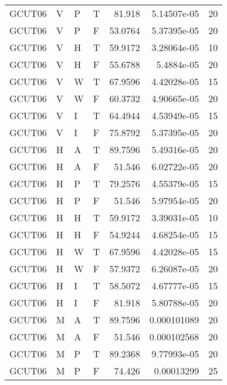 \begin{longtable}{llllrrr}
    GCUT06   & V     & P     & T          & 81.918     & 5.14507e-05 & 20       \\
    GCUT06   & V     & P     & F          & 53.0764    & 5.37395e-05 & 20       \\
    GCUT06   & V     & H     & T          & 59.9172    & 3.28064e-05 & 10       \\
    GCUT06   & V     & H     & F          & 55.6788    & 5.4884e-05  & 20       \\
    GCUT06   & V     & W     & T          & 67.9596    & 4.42028e-05 & 15       \\
    GCUT06   & V     & W     & F          & 60.3732    & 4.90665e-05 & 20       \\
    GCUT06   & V     & I     & T          & 64.4944    & 4.53949e-05 & 15       \\
    GCUT06   & V     & I     & F          & 75.8792    & 5.37395e-05 & 20       \\
    GCUT06   & H     & A     & T          & 89.7596    & 5.49316e-05 & 20       \\
    GCUT06   & H     & A     & F          & 51.546     & 6.02722e-05 & 20       \\
    GCUT06   & H     & P     & T          & 79.2576    & 4.55379e-05 & 15       \\
    GCUT06   & H     & P     & F          & 51.546     & 5.97954e-05 & 20       \\
    GCUT06   & H     & H     & T          & 59.9172    & 3.39031e-05 & 10       \\
    GCUT06   & H     & H     & F          & 54.9244    & 4.68254e-05 & 15       \\
    GCUT06   & H     & W     & T          & 67.9596    & 4.42028e-05 & 15       \\
    GCUT06   & H     & W     & F          & 57.9372    & 6.26087e-05 & 20       \\
    GCUT06   & H     & I     & T          & 58.5072    & 4.67777e-05 & 15       \\
    GCUT06   & H     & I     & F          & 81.918     & 5.80788e-05 & 20       \\
    GCUT06   & M     & A     & T          & 89.7596    & 0.000101089 & 20       \\
    GCUT06   & M     & A     & F          & 51.546     & 0.000102568 & 20       \\
    GCUT06   & M     & P     & T          & 89.2368    & 9.77993e-05 & 20       \\
    GCUT06   & M     & P     & F          & 74.426     & 0.00013299  & 25       \\

\end{longtable}
